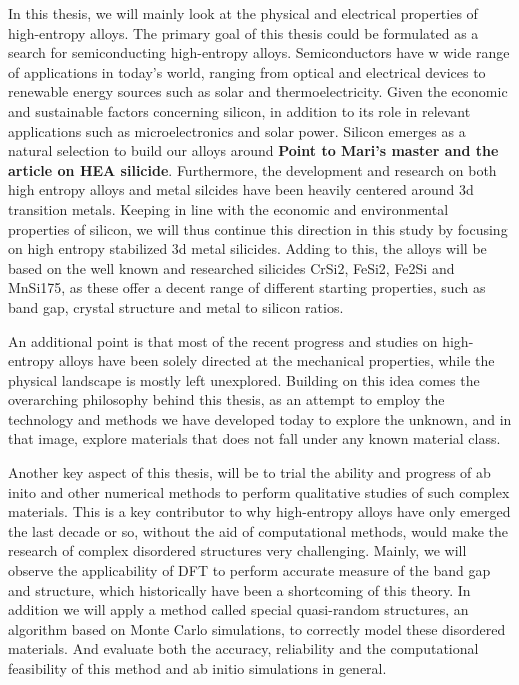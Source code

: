 \documentclass[UKenglish]{ifimaster}  %
\begin{document}
In this thesis, we will mainly look at the physical and electrical properties of high-entropy alloys. The primary goal of this thesis could be formulated as a search for semiconducting high-entropy alloys. Semiconductors have w wide range of applications in today's world, ranging from optical and electrical devices to renewable energy sources such as solar and thermoelectricity. Given the economic and sustainable factors concerning silicon, in addition to its role in relevant applications such as microelectronics and solar power. Silicon emerges as a natural selection to build our alloys around \textbf{Point to Mari's master and the article on HEA silicide}. Furthermore, the development and research on both high entropy alloys and metal silcides have been heavily centered around 3d transition metals. Keeping in line with the economic and environmental properties of silicon, we will thus continue this direction in this study by focusing on high entropy stabilized 3d metal silicides. Adding to this, the alloys will be based on the well known and researched silicides CrSi2, FeSi2, Fe2Si and MnSi175, as these offer a decent range of different starting properties, such as band gap, crystal structure and metal to silicon ratios. 

An additional point is that most of the recent progress and studies on high-entropy alloys have been solely directed at the mechanical properties, while the physical landscape is mostly left unexplored. Building on this idea comes the overarching philosophy behind this thesis, as an attempt to employ the technology and methods we have developed today to explore the unknown, and in that image, explore materials that does not fall under any known material class. 

Another key aspect of this thesis, will be to trial the ability and progress of ab inito and other numerical methods to perform qualitative studies of such complex materials. This is a key contributor to why high-entropy alloys have only emerged the last decade or so, without the aid of computational methods, would make the research of complex disordered structures very challenging. Mainly, we will observe the applicability of DFT to perform accurate measure of the band gap and structure, which historically have been a shortcoming of this theory. In addition we will apply a method called special quasi-random structures, an algorithm based on Monte Carlo simulations, to correctly model these disordered materials. And evaluate both the accuracy, reliability and the computational feasibility of this method and ab initio simulations in general.  
\end{document}
